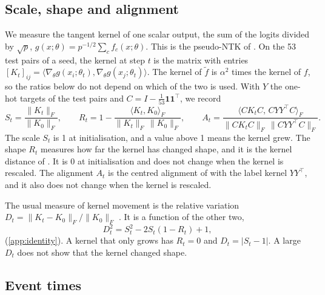 \documentclass[a4paper,11pt]{article} %
\newcommand{\Fnorm}[1]{\lVert #1\rVert_F}
\begin{document}
\subsection{Scale, shape and alignment}\label{sec:statistics}

We measure the tangent kernel of one scalar output, the sum of the logits
divided by $\sqrt p$, $g(x;\theta)=p^{-1/2}\sum_{c}f_c(x;\theta)$. This is the
pseudo-NTK of \citet{mohamadiFastWellFoundedApproximation2022}. On the 53 test
pairs of a seed, the kernel at step $t$ is the matrix with entries
$[K_t]_{ij}=\langle\nabla_\theta g(x_i;\theta_t),\nabla_\theta
g(x_j;\theta_t)\rangle$.
The kernel of $\tilde f$ is $\alpha^2$ times the kernel of $f$, so the ratios
below do not depend on which of the two is used. With $Y$ the one-hot targets
of the test pairs and $C=I-\frac1{53}\mathbf{1}\mathbf{1}^\top$, we record
\begin{equation}
  S_t = \frac{\Fnorm{K_t}}{\Fnorm{K_0}},\qquad
  R_t = 1-\frac{\langle K_t,K_0\rangle_F}{\Fnorm{K_t}\,\Fnorm{K_0}},\qquad
  A_t = \frac{\langle CK_tC,\,CYY^\top C\rangle_F}
  {\Fnorm{CK_tC}\,\Fnorm{CYY^\top C}}.
  \label{eq:statistics}
\end{equation}
The scale $S_t$ is 1 at initialisation, and a value above 1 means the kernel
grew. The shape $R_t$ measures how far the kernel has changed shape, and it is
the kernel distance of \citet{fortDeepLearningKernel2020}. It is 0 at
initialisation and does not change when the kernel is rescaled. The
alignment $A_t$ is the centred
alignment of \citet{cortesAlgorithmsLearningKernels2024} with the label kernel
$YY^\top$, and it also does not change when the kernel is rescaled.

The usual measure of kernel movement is the relative variation
$D_t=\Fnorm{K_t-K_0}/\Fnorm{K_0}$ \citep{geigerDisentanglingFeatureLazy2020}. It
is a function of the other two,
\begin{equation}
  D_t^2 = S_t^2 - 2S_t(1-R_t) + 1,
  \label{eq:identity}
\end{equation}
(\cref{app:identity}). A kernel that only grows has $R_t=0$ and
$D_t=\lvert S_t-1\rvert$. A large $D_t$ does not show that the kernel
changed shape.

\subsection{Event times}\label{sec:events}
\end{document}
